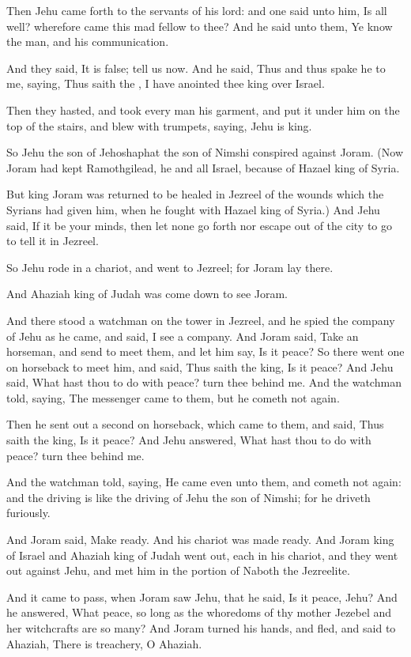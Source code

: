 \Verse Then Jehu came forth to the servants of his lord: and one said unto him, Is all well? wherefore came this mad fellow to thee? And he said unto them, Ye know the man, and his communication.

\Verse And they said, It is false; tell us now. And he said, Thus and thus spake he to me, saying, Thus saith the \LORD, I have anointed thee king over Israel.

\Verse Then they hasted, and took every man his garment, and put it under him on the top of the stairs, and blew with trumpets, saying, Jehu is king.

\Verse So Jehu the son of Jehoshaphat the son of Nimshi conspired against Joram. (Now Joram had kept Ramothgilead, he and all Israel, because of Hazael king of Syria.

\Verse But king Joram was returned to be healed in Jezreel of the wounds which the Syrians had given him, when he fought with Hazael king of Syria.)  And Jehu said, If it be your minds, then let none go forth nor escape out of the city to go to tell it in Jezreel.

\Verse So Jehu rode in a chariot, and went to Jezreel; for Joram lay there.

And Ahaziah king of Judah was come down to see Joram.

\Verse And there stood a watchman on the tower in Jezreel, and he spied the company of Jehu as he came, and said, I see a company. And Joram said, Take an horseman, and send to meet them, and let him say, Is it peace?  \Verse So there went one on horseback to meet him, and said, Thus saith the king, Is it peace? And Jehu said, What hast thou to do with peace? turn thee behind me. And the watchman told, saying, The messenger came to them, but he cometh not again.

\Verse Then he sent out a second on horseback, which came to them, and said, Thus saith the king, Is it peace? And Jehu answered, What hast thou to do with peace? turn thee behind me.

\Verse And the watchman told, saying, He came even unto them, and cometh not again: and the driving is like the driving of Jehu the son of Nimshi; for he driveth furiously.

\Verse And Joram said, Make ready. And his chariot was made ready. And Joram king of Israel and Ahaziah king of Judah went out, each in his chariot, and they went out against Jehu, and met him in the portion of Naboth the Jezreelite.

\Verse And it came to pass, when Joram saw Jehu, that he said, Is it peace, Jehu? And he answered, What peace, so long as the whoredoms of thy mother Jezebel and her witchcrafts are so many?  \Verse And Joram turned his hands, and fled, and said to Ahaziah, There is treachery, O Ahaziah.

